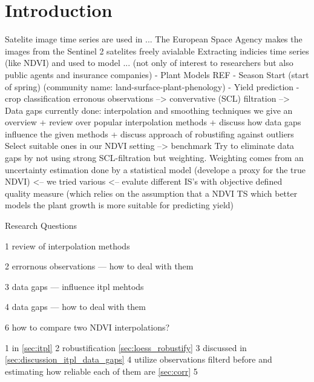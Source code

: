 \chapter{Introduction}


Satelite image time series are used in ...
    The European Space Agency makes the images from the Sentinel 2 satelites freely avialable
        Extracting indicies time series (like NDVI) and used to model ... (not only of interest to researchers but also public agents and insurance companies)
                        - Plant Models REF
                        - Season Start (start of spring) (community name: land-surface-plant-phenology)
                        - Yield prediction
                        - crop classification
            erronous observations --> convervative (SCL) filtration 
                --> Data gaps
                    currently done: interpolation and smoothing techniques
                    we give an overview + review over popular interpolation methods + discuss how data gaps influence the given methods + discuss approach of robustifing against outliers
                    Select suitable ones in our NDVI setting --> benchmark
                Try to eliminate data gaps by not using strong SCL-filtration but weighting. Weighting comes from an uncertainty estimation done by a statistical model (develope a proxy for the true NDVI) <-- we tried various <-- evalute different IS's with objective defined quality measure (which relies on the assumption that a NDVI TS which better models the plant growth is more suitable for predicting yield)
            


Research Questions
\begin{Nenumerate}
    \item 1 review of interpolation methods
    \item 2 errornous observations --- how to deal with them
    \item 3 data gaps --- influence itpl mehtods 
    \item 4 data gaps --- how to deal with them
    \item 6 how to compare two NDVI interpolations?
\end{Nenumerate}
1 in \ref{sec:itpl}
2 robustification \ref{sec:loess_robustify}
3 discussed in \ref{sec:discussion_itpl_data_gaps}
4 utilize observations filterd before and estimating how reliable each of them are \ref{sec:corr}
5 

